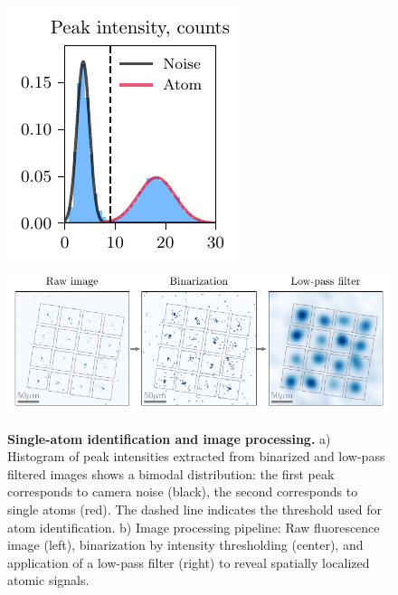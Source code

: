\begin{figure}[h]
    \centering
    \includegraphics{fig-py/imaging-hist.pdf}
    \hfill
    \includegraphics{fig-py/imaging-base.pdf}
    \caption{
        \textbf{Single-atom identification and image processing.}
        a) Histogram of peak intensities extracted from binarized and low-pass filtered images shows a bimodal distribution: the first peak corresponds to camera noise (black), the second corresponds to single atoms (red). The dashed line indicates the threshold used for atom identification.
        b) Image processing pipeline: Raw fluorescence image (left), binarization by intensity thresholding (center), and application of a low-pass filter (right) to reveal spatially localized atomic signals. 
    }
    \label{fig:imaging}
\end{figure}



\newpage

